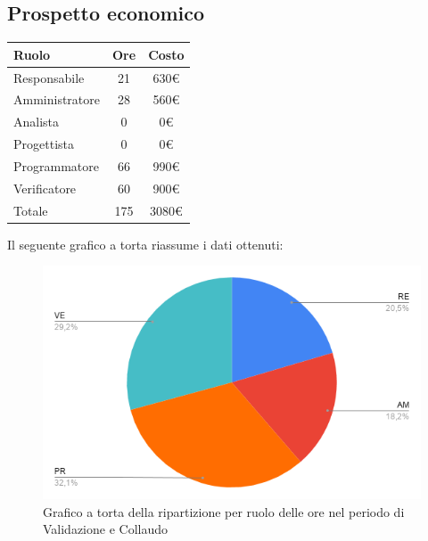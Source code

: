{{{{{{{{{\subsection{Prospetto economico}\label{PreventivoPreventivoFaseDiProgettazionediValidazioneECollaudoProspettoEconomico}
\quad
\def\tabularxcolumn#1{m{#1}}
{
	\begin{center}
		\renewcommand{\arraystretch}{1.4}
		\begin{tabularx}{7cm}{|X|c|c|}
			\hline
			\rowcolor{airforceblue}
			\textbf{Ruolo} & \textbf{Ore} & \textbf{Costo}\\
			\hline
			Responsabile & 21 & 630\euro\\
			\hline
			Amministratore & 28 & 560\euro\\
			\hline
			Analista & 0 & 0\euro\\
			\hline
			Progettista & 0 & 0\euro\\
			\hline
			Programmatore & 66 & 990\euro\\
			\hline
			Verificatore & 60 & 900\euro\\
			\hline
			Totale & 175 & 3080\euro\\
			\hline
		\end{tabularx}
	\end{center}

Il seguente grafico a torta riassume i dati ottenuti:
\begin{figure}[!ht]
	\begin{center}
		\includegraphics[width=0.8\linewidth]{../immagini/pdp/torta_validazione.png}
		\caption{Grafico a torta della ripartizione per ruolo delle ore nel periodo di Validazione e Collaudo}
	\end{center}
\end{figure}

}}}}}}}}}}
